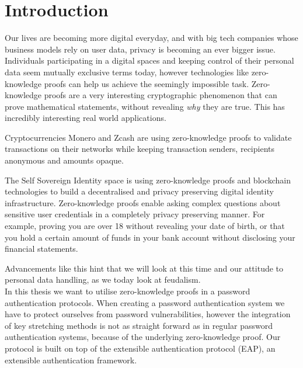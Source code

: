 

\section{Introduction} %
%

Our lives are becoming more digital everyday, and with big tech companies whose business models rely on user data, privacy is becoming an ever bigger issue.
Individuals participating in a digital spaces and keeping control of their personal data seem mutually exclusive terms today, however technologies like zero-knowledge proofs can help us achieve the seemingly impossible task.
Zero-knowledge proofs are a very interesting cryptographic phenomenon that can prove mathematical statements, without revealing \textit{why} they are true. This has incredibly interesting real world applications.

Cryptocurrencies Monero and Zcash are using zero-knowledge proofs to validate transactions on their networks while keeping transaction senders, recipients anonymous and amounts opaque.

The Self Sovereign Identity space is using zero-knowledge proofs and blockchain technologies to build a decentralised and privacy preserving digital identity infrastructure.
Zero-knowledge proofs enable asking complex questions about sensitive user credentials in a completely privacy preserving manner.
For example, proving you are over 18 without revealing your date of birth, or that you hold a certain amount of funds in your bank account without disclosing your financial statements.

Advancements like this hint that we will look at this time and our attitude to personal data handling, as we today look at feudalism.
\bigskip
\\
In this thesis we want to utilise zero-knowledge proofs in a password authentication protocols.
When creating a password authentication system we have to protect ourselves from password vulnerabilities, however the integration of key stretching methods is not as straight forward as in regular password authentication systems, because of the underlying zero-knowledge proof.
Our protocol is built on top of the extensible authentication protocol (EAP), an extensible authentication framework.

